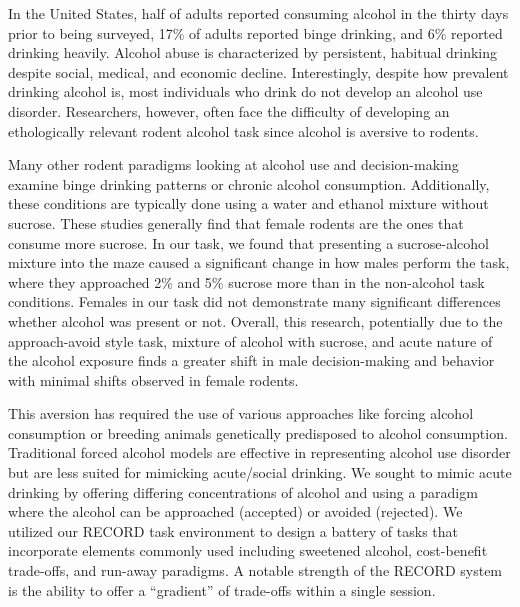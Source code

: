 \documentclass{article}
\begin{document}
\vspace{1em}

In the United States, half of adults reported consuming alcohol in the thirty days prior to being surveyed, 17\% of adults reported binge drinking, and 6\% reported drinking heavily\cite{centers2008behavioral}. Alcohol abuse is characterized by persistent, habitual drinking despite social, medical, and economic decline. Interestingly, despite how prevalent drinking alcohol is, most individuals who drink do not develop an alcohol use disorder\cite{kranzler2023overview}. Researchers, however, often face the difficulty of developing an ethologically relevant rodent alcohol task since alcohol is aversive to rodents\cite{pautassi2011ethanol}.

\vspace{1em}

Many other rodent paradigms looking at alcohol use and decision-making examine binge drinking patterns or chronic alcohol consumption\cite{strong2010binge, jury2017sex}. Additionally, these conditions are typically done using a water and ethanol mixture without sucrose\cite{crabbe2009line, hwa2011persistent}. These studies generally find that female rodents are the ones that consume more sucrose\cite{strong2010binge, hwa2011persistent, jury2017sex}. In our task, we found that presenting a sucrose-alcohol mixture into the maze caused a significant change in how males perform the task, where they approached 2\% and 5\% sucrose more than in the non-alcohol task conditions. Females in our task did not demonstrate many significant differences whether alcohol was present or not. Overall, this research, potentially due to the approach-avoid style task, mixture of alcohol with sucrose, and acute nature of the alcohol exposure finds a greater shift in male decision-making and behavior with minimal shifts observed in female rodents.

\vspace{1em}

This aversion has required the use of various approaches like forcing alcohol consumption\cite{thiele2014drinking, mendoza2018forced} or breeding animals genetically predisposed to alcohol consumption\cite{timme2020alcohol, borruto2021genetically, sauton2021interstrain}. Traditional forced alcohol models are effective in representing alcohol use disorder but are less suited for mimicking acute/social drinking. We sought to mimic acute drinking by offering differing concentrations of alcohol and using a paradigm where the alcohol can be approached (accepted) or avoided (rejected). We utilized our RECORD task environment to design a battery of tasks that incorporate elements commonly used including sweetened alcohol, cost-benefit trade-offs, and run-away paradigms. A notable strength of the RECORD system is the ability to offer a “gradient” of trade-offs within a single session.
\end{document}
